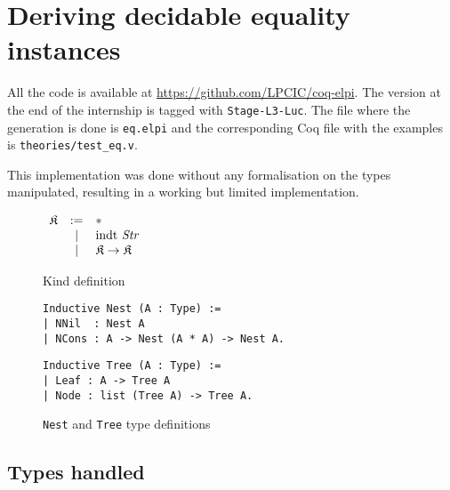 \documentclass{article}
\newcommand{\K}{\mathfrak{K}}
\begin{document}
\section{Deriving decidable equality instances}\label{deceq}

All the code is available at \url{https://github.com/LPCIC/coq-elpi}. The version
at the end of the internship is tagged with \texttt{Stage-L3-Luc}. The file
where the generation is done is \texttt{eq.elpi} and the corresponding Coq file
with the examples is \texttt{theories/test\_eq.v}.

This implementation was done without any formalisation on the types manipulated,
resulting in a working but limited implementation.

\begin{figure}
    \begin{center}$\begin{array}{rcl}
        \K & := & * \\
           & |  & \text{indt \emph{Str}} \\
           & |  & \K\rightarrow\K \\
    \end{array}$\end{center}
    \caption{Kind definition}
    \label{kinds}
\end{figure}

\begin{figure}
    \begin{verbatim}
Inductive Nest (A : Type) :=
| NNil  : Nest A
| NCons : A -> Nest (A * A) -> Nest A.
    \end{verbatim} 

    \begin{verbatim}
Inductive Tree (A : Type) :=
| Leaf : A -> Tree A
| Node : list (Tree A) -> Tree A.
    \end{verbatim}
    \caption{\texttt{Nest} and \texttt{Tree} type definitions}
    \label{types}
\end{figure}

\newpage
\subsection{Types handled}
\end{document}
